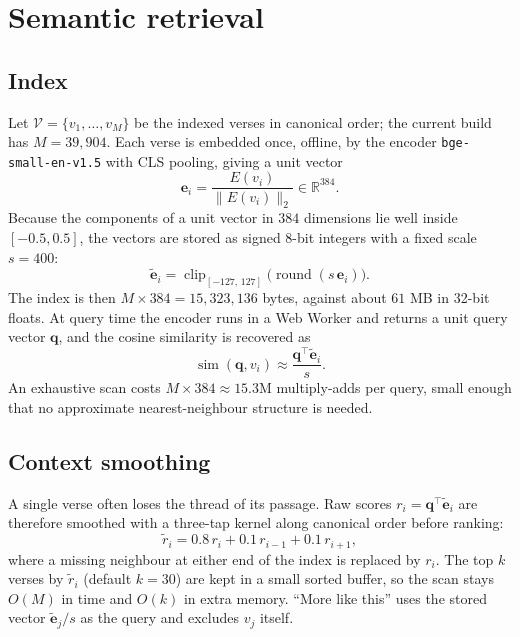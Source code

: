 \documentclass[11pt]{article}
\newcommand{\R}{\mathbb{R}}
\newcommand{\code}[1]{\texttt{#1}}
\begin{document}
\section{Semantic retrieval}\label{sec:semantic}

\subsection{Index}

Let $\mathcal{V} = \{v_1, \dots, v_M\}$ be the indexed verses in canonical
order; the current build has $M = 39{,}904$. Each verse is embedded once,
offline, by the encoder \code{bge-small-en-v1.5} \cite{bge} with CLS pooling,
giving a unit vector
\begin{equation}
  \bm{e}_i = \frac{E(v_i)}{\lVert E(v_i) \rVert_2} \in \R^{384}.
\end{equation}
Because the components of a unit vector in $384$ dimensions lie well inside
$[-0.5, 0.5]$, the vectors are stored as signed $8$-bit integers with a fixed
scale $s = 400$:
\begin{equation}
  \tilde{\bm{e}}_i = \operatorname{clip}_{[-127,\,127]}\bigl(\operatorname{round}(s\,\bm{e}_i)\bigr).
\end{equation}
The index is then $M \times 384 = 15{,}323{,}136$ bytes, against about $61$ MB in
32-bit floats. At query time the encoder runs in a Web Worker and returns a unit
query vector $\bm{q}$, and the cosine similarity is recovered as
\begin{equation}\label{eq:sim}
  \operatorname{sim}(\bm{q}, v_i) \approx \frac{\bm{q}^\top \tilde{\bm{e}}_i}{s}.
\end{equation}
An exhaustive scan costs $M \times 384 \approx 15.3$M multiply-adds per query,
small enough that no approximate nearest-neighbour structure is needed.

\subsection{Context smoothing}

A single verse often loses the thread of its passage. Raw scores
$r_i = \bm{q}^\top\tilde{\bm{e}}_i$ are therefore smoothed with a three-tap kernel
along canonical order before ranking:
\begin{equation}
  \tilde{r}_i = 0.8\, r_i + 0.1\, r_{i-1} + 0.1\, r_{i+1},
\end{equation}
where a missing neighbour at either end of the index is replaced by $r_i$. The
top $k$ verses by $\tilde{r}_i$ (default $k = 30$) are kept in a small sorted
buffer, so the scan stays $O(M)$ in time and $O(k)$ in extra memory. \enquote{More
like this} uses the stored vector $\tilde{\bm{e}}_j / s$ as the query and excludes
$v_j$ itself.
\end{document}
